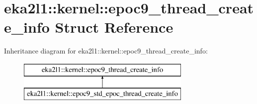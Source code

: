 \hypertarget{structeka2l1_1_1kernel_1_1epoc9__thread__create__info}{}\section{eka2l1\+:\+:kernel\+:\+:epoc9\+\_\+thread\+\_\+create\+\_\+info Struct Reference}
\label{structeka2l1_1_1kernel_1_1epoc9__thread__create__info}
Inheritance diagram for eka2l1\+:\+:kernel\+:\+:epoc9\+\_\+thread\+\_\+create\+\_\+info\+:\begin{figure}[H]
\begin{center}
\leavevmode
\includegraphics[height=2.000000cm]{structeka2l1_1_1kernel_1_1epoc9__thread__create__info}
\end{center}
\end{figure}
